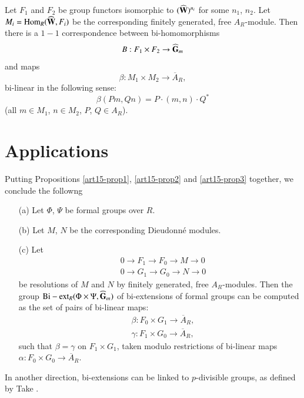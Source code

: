 \begin{coro*}
Let $F_{1}$ and $F_{2}$ be group functors isomorphic to $(\widehat{\mathbf{W}})^{n_{i}}$ for some $n_{1}$, $n_{2}$. Let $M_{i}=\operatorname{\mathrm{Hom}}_{R}(\widehat{\mathbf{W}},F_{i})$ be the corresponding finitely generated, free $A_{R}$-module. Then there is a $1-1$ correspondence between bi-homomorphisms
$$
B:F_{1}\times F_{2}\to \widehat{\mathbf{G}}_{m}
$$
and maps
$$
\beta : M_{1}\times M_{2}\to \overline{A}_{R},
$$\pageoriginale
bi-linear in the following sense:
$$
\beta (Pm,Qn)=P\cdot (m,n)\cdot Q^{*}
$$
(all $m\in M_{1}$, $n\in M_{2}$, $P$, $Q\in A_{R}$).
\end{coro*}

\section{Applications}\label{art15-sec5}

Putting Propositions \ref{art15-prop1}, \ref{art15-prop2} and \ref{art15-prop3} together, we conclude the followng

\begin{coro*}
\begin{itemize}
\item[(a)] Let $\Phi$, $\Psi$ be formal groups over $R$.

\item[(b)] Let $M$, $N$ be the corresponding Dieudonn\'e modules.

\item[(c)] Let
\begin{align*}
& 0\to F_{1}\to F_{0}\to M\to 0\\
& 0\to G_{1}\to G_{0}\to N\to 0
\end{align*}
be resolutions of $M$ and $N$ by finitely generated, free $A_{R}$-modules. Then the group ${\rm Bi-ext}_{R}(\Phi\times \Psi, \widehat{\mathbf{G}}_{m})$ of bi-extensions of formal groups can be computed as the set of pairs of bi-linear maps:
\begin{align*}
& \beta : F_{0}\times G_{1}\to \overline{A}_{R},\\
& \gamma : F_{1}\times G_{0}\to \overline{A}_{R},
\end{align*}
such that $\beta=\gamma$ on $F_{1}\times G_{1}$, taken modulo restrictions of bi-linear maps $\alpha : F_{0}\times G_{0}\to \overline{A}_{R}$.
\end{itemize}
\end{coro*}

In another direction, bi-extensions can be linked to $p$-divisible groups, as defined by Take \cite{art15-key6}.

